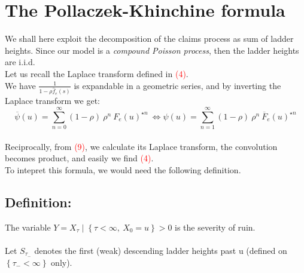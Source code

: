  \section{The Pollaczek-Khinchine formula}
We shall here exploit the decomposition of the claims process as sum of ladder heights. Since our model is a \textit{compound Poisson process}, then the ladder heights are i.i.d. \\
Let us recall the Laplace transform defined in \textcolor{red}{(4)}.\\
 We have $ \frac{1}{1-\rho \hat{f}_{e}(s)}$ is expandable in a geometric series, and by inverting the Laplace transform we get:
\begin{equation}
\overline{\psi}(u)= \sum_{n=0}^{\infty} (1-\rho) \  \rho^{n} \ F_{e}(u)^{\star n} \ \Leftrightarrow \psi (u)= \sum_{n=1}^{\infty} (1-\rho) \  \rho^{n} \  \overline{F}_{e}(u)^{\star n}
\end{equation} \\
Reciprocally, from \textcolor{red}{(9)}, we calculate its Laplace transform, the convolution becomes product, and easily we find \textcolor{red}{(4)}.\\
To intepret this formula, we would need the following definition.

\subsection{Definition:}
The variable $ Y= X_{\tau}\mid \left\{ \tau <\infty ,  \ X_{0}= u\right\} >0$  is the severity of ruin. \\ \\
Let $S_{\tau_{-}}$ denotes the first (weak) descending ladder heights past u (defined on $\left\{ \tau_{-}< \infty \right\}$ only).
